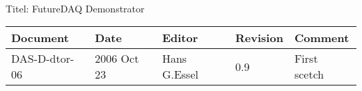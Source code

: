\\Titel: FutureDAQ Demonstrator
\begin{table}[h]
\begin{tabular}{|p{2.8cm}|p{2.0cm}|p{3.0cm}|p{1.6cm}|p{5.0cm}|} \hline
Document   & Date        & Editor       & Revision & Comment \\
\hline DAS-D-dtor-06 & 2006 Oct 23 & Hans G.Essel & 0.9      &
First scetch \\ \hline
\end{tabular}
\end{table}

